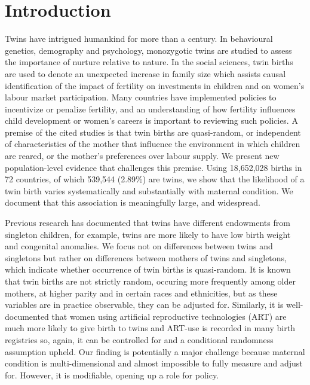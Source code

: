 \documentclass[11pt]{article}
\begin{document}

\newpage
\section*{Introduction}
Twins have intrigued humankind for more than a century\cite{Thorndike1905}. %
In behavioural genetics, demography and psychology, monozygotic twins are studied to assess the importance of nurture relative to nature\cite{Thorndike1905,Boomsmaetal2002,Poldermanetal2015,Phillips1993,BouchardPropping1993,McClearnetal1997,Nisen2013}. In the social sciences, twin births are used to denote an unexpected increase in family size which assists causal identification of the impact of fertility on investments in children and on women's labour market participation\cite{WolpinRosenzweig2000,RosenzweigWolpin1980,BronarsGrogger1994}. Many countries have implemented policies to incentivize or penalize fertility, and an understanding of how fertility influences child development or women's careers is important to reviewing such policies. A premise of the cited studies is that twin births are quasi-random, or independent of characteristics of the mother that influence the environment in which children are reared, or the mother's preferences over labour supply. We present new population-level evidence that challenges this premise. Using 18,652,028 births in 72 countries, of which 539,544 (2.89\%) are twins, we show that the likelihood of a twin birth varies systematically and substantially with maternal condition. We document that this association is meaningfully large, and widespread.

Previous research has documented that twins have different endowments from singleton children, for example, twins are more likely to have low birth weight and congenital anomalies\cite{Hall2003}. We focus not on differences between twins and singletons but rather on differences between mothers of twins and singletons, which indicate whether occurrence of twin births is quasi-random. It is known that twin births are not strictly random, occuring more frequently among older mothers, at higher parity and in certain races and ethnicities\cite{Hall2003, Bulmer1970}, but as these variables are in practice observable, they can be adjusted for. Similarly, it is well-documented that women using artificial reproductive technologies (ART) are much more likely to give birth to twins\cite{Vitthalaetal2009} and ART-use is recorded in many birth registries so, again, it can be controlled for and a conditional randomness assumption upheld. Our finding is potentially a major challenge because maternal condition is multi-dimensional and almost impossible to fully measure and adjust for. However, it is modifiable, opening up a role for policy.
\end{document}

